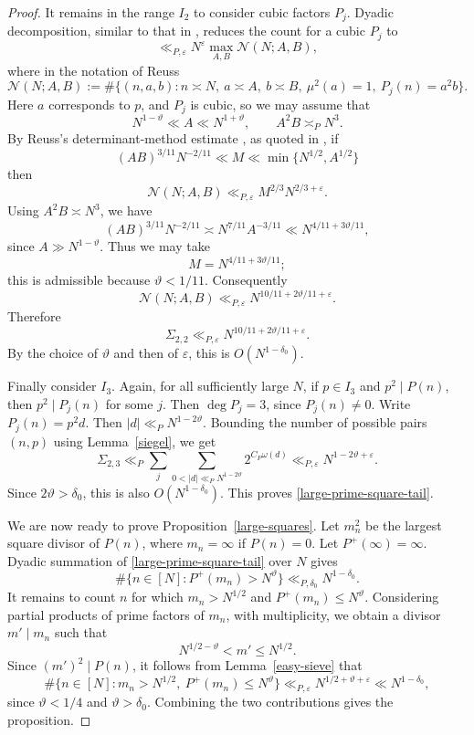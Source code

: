 \documentclass[reqno, 12pt]{amsart}
\theoremstyle{plain}
\theoremstyle{definition}
\theoremstyle{remark}
\renewcommand{\leq}{\leqslant}
\begin{document}
\begin{proof}
It remains in the range $I_2$ to consider cubic factors $P_j$.
Dyadic decomposition,
similar to that in \cite[proof of Lemma~4.3]{BookerBrowning},
reduces the count for a cubic \(P_j\) to
\[
 \ll_{P,\varepsilon}
 N^\varepsilon
 \max_{A,B}
 \mathcal N(N;A,B),
\]
where in the notation of Reuss
\[
 \mathcal N(N;A,B)
 :=
 \#\{(n,a,b): n\asymp N,\ a\asymp A,\ b\asymp B,\ \mu^2(a)=1,\ P_j(n)=a^2b\}.
\]
Here \(a\) corresponds to \(p\), and $P_j$ is cubic, so we may assume that
\[
N^{1-\vartheta} \ll A \ll N^{1+\vartheta},
\qquad
 A^2B\asymp_P N^3.
\]
By Reuss's determinant-method estimate \cite{Reuss}, as quoted in
\cite[proof of Lemma~4.3]{BookerBrowning}, if
\[
 (AB)^{3/11}N^{-2/11}\ll M\ll \min\{N^{1/2},A^{1/2}\}
\]
then
\[
 \mathcal N(N;A,B)\ll_{P,\varepsilon} M^{2/3}N^{2/3+\varepsilon}.
\]
Using \(A^2B\asymp N^3\), we have
\[
 (AB)^{3/11}N^{-2/11}
 \asymp N^{7/11}A^{-3/11}
 \ll N^{4/11+3\vartheta/11},
\]
since \(A\gg N^{1-\vartheta}\).
Thus we may take
\[
 M=N^{4/11+3\vartheta/11};
\]
this is admissible because \(\vartheta<1/11\). Consequently
\[
 \mathcal N(N;A,B)
 \ll_{P,\varepsilon}
 N^{10/11+2\vartheta/11+\varepsilon}.
\]
Therefore
\[
 \Sigma_{2,2}
 \ll_{P,\varepsilon}
 N^{10/11+2\vartheta/11+\varepsilon}.
\]
By the choice of \(\vartheta\) and then of \(\varepsilon\), this is
\(O(N^{1-\delta_0})\).

Finally consider \(I_3\). Again, for all sufficiently large \(N\), if
\(p\in I_3\) and \(p^2\mid P(n)\), then \(p^2\mid P_j(n)\) for some \(j\).
Then \(\deg P_j=3\), since $P_j(n)\ne 0$.
Write
$P_j(n)=p^2d$.
Then $|d|\ll_P N^{1-2\vartheta}$.
Bounding the number of possible pairs \((n,p)\) using Lemma~\ref{siegel}, we get
\[
 \Sigma_{2,3}
 \ll_P
 \sum_j\sum_{0<|d|\ll_P N^{1-2\vartheta}}2^{C_P\omega(d)}
 \ll_{P,\varepsilon} N^{1-2\vartheta+\varepsilon}.
\]
Since \(2\vartheta>\delta_0\), this is also \(O(N^{1-\delta_0})\). This proves
\eqref{large-prime-square-tail}.

We are now ready to prove Proposition~\ref{large-squares}.
Let $m_n^2$ be the largest square divisor of $P(n)$,
where $m_n=\infty$ if $P(n)=0$.
Let $P^+(\infty)=\infty$.
Dyadic summation of \eqref{large-prime-square-tail} over $N$ gives
$$\#\{n\in[N]: P^+(m_n)>N^\vartheta\}\ll_{P,\delta_0} N^{1-\delta_0}.$$
It remains to count \(n\) for which
$m_n>N^{1/2}$ and $P^+(m_n)\leq N^\vartheta$.
Considering partial products of
prime factors of \(m_n\), with multiplicity, we obtain a divisor \(m'\mid m_n\) such that
\[
 N^{1/2-\vartheta}<m'\leq N^{1/2}.
\]
Since \((m')^2\mid P(n)\), it follows from Lemma~\ref{easy-sieve} that
\[
\#\{n\in[N]: m_n>N^{1/2},\ P^+(m_n)\leq N^\vartheta\}
\ll_{P,\varepsilon}
 N^{1/2+\vartheta+\varepsilon}
 \ll N^{1-\delta_0},
\]
since \(\vartheta<1/4\) and \(\vartheta>\delta_0\).
Combining the two contributions gives the proposition.
\end{proof}
\end{document}
